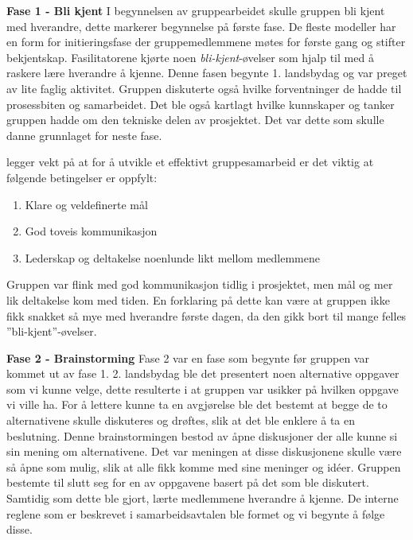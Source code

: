 


\textbf{\Large Fase 1 - Bli kjent}
I begynnelsen av gruppearbeidet skulle gruppen bli kjent med hverandre, dette markerer begynnelse på første fase.
De fleste modeller har en form for initieringsfase der gruppemedlemmene møtes for første gang og stifter bekjentskap.
Fasilitatorene kjørte noen \textit{bli-kjent}-øvelser som hjalp til med å raskere lære hverandre å kjenne.
Denne fasen begynte 1. landsbydag og var preget av lite faglig aktivitet.
Gruppen diskuterte også hvilke forventninger de hadde til prosessbiten og samarbeidet.
Det ble også kartlagt hvilke kunnskaper og tanker gruppen hadde om den tekniske delen av prosjektet.
Det var dette som skulle danne grunnlaget for neste fase.

\citet{johnson} legger vekt på at for å utvikle et effektivt gruppesamarbeid er det viktig at følgende betingelser er oppfylt:
\begin{enumerate}
    \item Klare og veldefinerte mål
    \item God toveis kommunikasjon
    \item Lederskap og deltakelse noenlunde likt mellom medlemmene
\end{enumerate}
Gruppen var flink med god kommunikasjon tidlig i prosjektet, men mål og mer lik deltakelse kom med tiden.
En forklaring på dette kan være at gruppen ikke fikk snakket så mye med hverandre første dagen, da den gikk bort til mange felles ''bli-kjent''-øvelser.
\vspace{\secspace}



\noindent \textbf{\Large Fase 2 - Brainstorming}
Fase 2 var en fase som begynte før gruppen var kommet ut av fase 1.
2. landsbydag ble det presentert noen alternative oppgaver som vi kunne velge, dette resulterte i at gruppen var usikker på hvilken oppgave vi ville ha.
For å lettere kunne ta en avgjørelse ble det bestemt at begge de to alternativene skulle diskuteres og drøftes, slik at det ble enklere å ta en beslutning.
Denne brainstormingen bestod av åpne diskusjoner der alle kunne si sin mening om alternativene.
Det var meningen at disse diskusjonene skulle være så åpne som mulig, slik at alle fikk komme med sine meninger og idéer.
Gruppen bestemte til slutt seg for en av oppgavene basert på det som ble diskutert.
Samtidig som dette ble gjort, lærte medlemmene hverandre å kjenne.
De interne reglene som er beskrevet i samarbeidsavtalen ble formet og vi begynte å følge disse.

